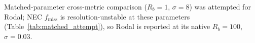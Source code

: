 \protect\linebreak\vspace*{3pt} Matched-parameter cross-metric comparison ($R_b = 1$, $\sigma = 8$) was attempted for Rodal; NEC $f_{\text{miss}}$ is resolution-unstable at these parameters (Table~\ref{tab:matched_attempt}), so Rodal is reported at its native $R_b = 100$, $\sigma = 0.03$.
